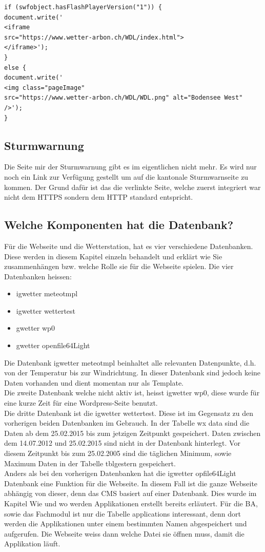 \documentclass[a4paper,ngerman, 11pt, pagesize]{report}
\begin{document}
\begin{lstlisting}
if (swfobject.hasFlashPlayerVersion("1")) {
document.write('
<iframe 
src="https://www.wetter-arbon.ch/WDL/index.html">
</iframe>');
} 
else {
document.write('
<img class="pageImage" 
src="https://www.wetter-arbon.ch/WDL/WDL.png" alt="Bodensee West" 
/>');
}
\end{lstlisting}

\subsection{Sturmwarnung}
Die Seite mir der Sturmwarnung gibt es im eigentlichen nicht mehr. Es wird nur noch ein Link zur Verfügung gestellt um auf die kantonale Sturmwarnseite zu kommen. Der Grund dafür ist das die verlinkte Seite, welche zuerst integriert war nicht dem HTTPS sondern dem HTTP standard entspricht. 

\subsection{Welche Komponenten hat die Datenbank?}
Für die Webseite und die Wetterstation, hat es vier verschiedene Datenbanken. Diese werden in diesem Kapitel einzeln behandelt und erklärt wie Sie zusammenhängen bzw. welche Rolle sie für die Webseite spielen. Die vier Datenbanken heissen:
\begin{itemize}  
\item igwetter meteotmpl
\item igwetter wettertest
\item gwetter wp0
\item gwetter openfile64Light
\end{itemize}

Die Datenbank igwetter meteotmpl beinhaltet alle relevanten Datenpunkte, d.h. von der Temperatur bis zur Windrichtung. In dieser Datenbank sind jedoch keine Daten vorhanden und dient momentan nur als Template.\\
Die zweite Datenbank welche nicht aktiv ist, heisst igwetter wp0, diese wurde für eine kurze Zeit für eine Wordpress-Seite benutzt.\\
Die dritte Datenbank ist die igwetter wettertest. Diese ist im Gegensatz zu den vorherigen beiden Datenbanken im Gebrauch. In der Tabelle wx data sind die Daten ab dem 25.02.2015 bis zum jetzigen Zeitpunkt gespeichert. Daten zwischen dem 14.07.2012 und 25.02.2015 sind nicht in der Datenbank hinterlegt. Vor diesem Zeitpunkt bis zum 25.02.2005 sind die täglichen Minimum, sowie Maximum Daten in der Tabelle tblgestern gespeichert.\\
Anders als bei den vorherigen Datenbanken hat die igwetter opfile64Light Datenbank eine Funktion für die Webseite. In diesem Fall ist die ganze Webseite abhängig von dieser, denn das CMS basiert auf einer Datenbank. Dies wurde im Kapitel Wie und wo werden Applikationen erstellt bereits erläutert. Für die BA, sowie das Fachmodul ist nur die Tabelle applications interessant, denn dort werden die Applikationen unter einem bestimmten Namen abgespeichert und aufgerufen. Die Webseite weiss dann welche Datei sie öffnen muss, damit die Applikation läuft.\\
\end{document}
